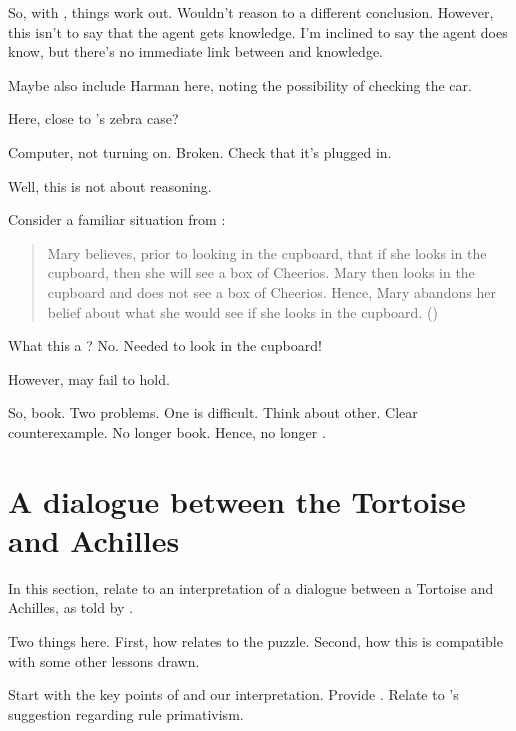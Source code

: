 \begin{note}
  So, with \citeauthor{Dretske:1970to}, things work out.
  Wouldn't reason to a different conclusion.
  However, this isn't to say that the agent gets knowledge.
  I'm inclined to say the agent does know, but there's no immediate link between \qzS{} and knowledge.

  Maybe also include Harman here, noting the possibility of checking the car.
\end{note}

\begin{note}
  Here, close to \citeauthor{Dretske:1970to}'s zebra case?
\end{note}

\begin{note}
  \begin{illustration}
    Computer, not turning on.
    Broken.
    Check that it's plugged in.
  \end{illustration}

  Well, this is not about reasoning.
\end{note}

\begin{note}
  Consider a familiar situation from \citeauthor{Harman:1986ux}:

  \begin{quote}
    Mary believes, prior to looking in the cupboard, that if she looks in the cupboard, then she will see a box of Cheerios.
    Mary then looks in the cupboard and does not see a box of Cheerios.
    Hence, Mary abandons her belief about what she would see if she looks in the cupboard.\nolinebreak
    \mbox{}\hfill\mbox{(\citeyear[Cf.][Chs.1\&2]{Harman:1986ux})}
  \end{quote}

  What this a \requ{}?
  No.
  Needed to look in the cupboard!

  However, \requ{} may fail to hold.

  So, book.
  Two problems.
  One is difficult.
  Think about other.
  Clear counterexample.
  No longer book.
  Hence, no longer \requ{}.
\end{note}

\section[The Tortoise and Achilles]{A dialogue between the Tortoise and Achilles}
\label{cha:zS:sec:question:illu:carroll}

\begin{note}
  In this section, relate \qzS{} to an interpretation of a dialogue between a Tortoise and Achilles, as told by \textcite{Carroll:1895uj}.

  Two things here.
  First, how \qzS{} relates to the puzzle.
  Second, how this is compatible with some other lessons drawn.

  Start with the key points of \textcite{Carroll:1895uj} and our interpretation.
  Provide .
  Relate to \citeauthor{Boghossian:2008vf}'s suggestion regarding rule primativism.
\end{note}

